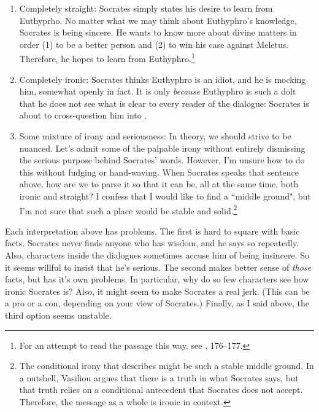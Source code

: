 \documentclass[11pt]{article}
\begin{document}
\begin{enumerate}

    \item Completely straight: Socrates simply states his desire to learn
        from Euthyprho.  No matter what we may think about Euthyphro's
        knowledge, Socrates is being sincere.  He wants to know more about
        divine matters in order (1) to be a better person and (2) to win
        his case against Meletus.  Therefore, he hopes to learn from
        Euthyphro.\footnote{For an attempt to read the passage this way,
        see \citet{wolfsdorf2007}, 176--177.}

    \item Completely ironic: Socrates thinks Euthyphro is an idiot, and he
        is mocking him, somewhat openly in fact.  It is only \emph{because}
        Euthyphro is such a dolt that he does not see what is clear to
        every reader of the dialogue: Socrates is about to cross-question
        him into .

    \item Some mixture of irony and seriousness: In theory, we should
        strive to be nuanced.  Let's admit some of the palpable irony
        without entirely dismissing the serious purpose behind Socrates'
        words.  However, I'm unsure how to do this without fudging or
        hand-waving.  When Socrates speaks that sentence above, how are we
        to parse it so that it can be, all at the same time, both ironic
        and straight?  I confess that I would like to find a ``middle
        ground", but I'm not sure that such a place would be stable and
        solid.\footnote{The conditional irony that \citet{vasiliou1998}
        describes might be such a stable middle ground.  In a nutshell,
        Vasiliou argues that there is a truth in what Socrates says, but
        that truth relies on a conditional antecedent that Socrates does
        not accept.  Therefore, the message as a whole is ironic in
        context.}

\end{enumerate}

Each interpretation above has problems.  The first is hard to square with
basic facts.  Socrates never finds anyone who has wisdom, and he says so
repeatedly.  Also, characters inside the dialogues sometimes accuse him of
being insincere.  So it seems willful to insist that he's serious.  The
second makes better sense of \emph{those} facts, but has it's own problems.
In particular, why do so few characters see how ironic Socrates is?  Also,
it might seem to make Socrates a real jerk.  (This can be a pro or a con,
depending on your view of Socrates.)  Finally, as I said above, the third
option seems unstable.
\end{document}
